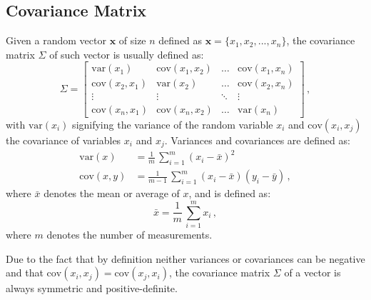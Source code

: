 \subsection{Covariance Matrix} \label{add:covariance_matrix}
Given a random vector $\mathbf{x}$ of size $n$ defined as $\mathbf{x} = \{x_1, x_2, ..., x_n\}$, the covariance matrix $\Sigma$ of such vector is usually defined as:
    \begin{equation*}
        \Sigma = 
        \begin{bmatrix}
            \text{var}(x_1) & \text{cov}(x_1, x_2) & \dots & \text{cov}(x_1, x_n) \\
            \text{cov}(x_2, x_1) & \text{var}(x_2) & \dots & \text{cov}(x_2, x_n) \\
            \vdots & \vdots & \ddots & \vdots \\
            \text{cov}(x_n, x_1) & \text{cov}(x_n, x_2) & \dots & \text{var}(x_n)
        \end{bmatrix}\,,
    \end{equation*}
with $\text{var}(x_i)$ signifying the variance of the random variable $x_i$ and $\text{cov}(x_i, x_j)$ the covariance of variables $x_i$ and $x_j$.
Variances and covariances are defined as:
    \begin{align*}
        \text{var}(x) &= \frac{1}{m}\,\sum\limits_{i=1}^m (x_i - \bar{x})^2\\
        \text{cov}(x,y) &= \frac{1}{m-1}\,\sum\limits_{i=1}^m (x_i - \bar{x})(y_i - \bar{y})\,,
    \end{align*}
where $\bar{x}$ denotes the mean or average of $x$, and is defined as:
    \begin{equation*}
        \bar{x} = \frac{1}{m}\,\sum\limits_{i=1}^m x_i\,,
    \end{equation*}
where $m$ denotes the number of measurements.

Due to the fact that by definition neither variances or covariances can be negative and that $\text{cov}(x_i, x_j) = \text{cov}(x_j, x_i)$, the covariance matrix $\Sigma$ of a vector is always symmetric and positive-definite.